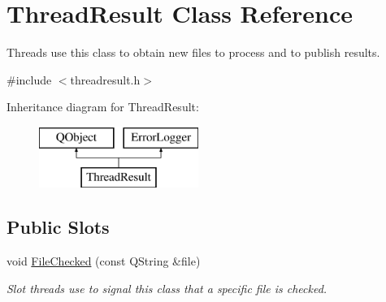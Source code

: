 \hypertarget{class_thread_result}{\section{Thread\-Result Class Reference}
\label{class_thread_result}
}


Threads use this class to obtain new files to process and to publish results.  




{\ttfamily \#include $<$threadresult.\-h$>$}

Inheritance diagram for Thread\-Result\-:\begin{figure}[H]
\begin{center}
\leavevmode
\includegraphics[height=2.000000cm]{class_thread_result}
\end{center}
\end{figure}
\subsection*{Public Slots}
\begin{DoxyCompactItemize}
\item 
void \hyperlink{class_thread_result_af21d11c7607fa94cf385586a1fa0a41e}{File\-Checked} (const Q\-String \&file)
\begin{DoxyCompactList}\small\item\em Slot threads use to signal this class that a specific file is checked. \end{DoxyCompactList}\end{DoxyCompactItemize}
